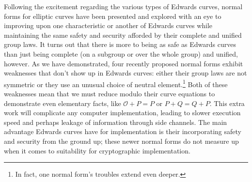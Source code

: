 Following the excitement regarding the various types of Edwards curves,
    normal forms for elliptic curves have been presented and explored with an
    eye to improving upon one characteristic or another of Edwards curves while
    maintaining the same safety and security afforded by their complete and
    unified group laws.
It turns out that there is more to being as safe as Edwards curves than just
    being complete (on a subgroup or over the whole group) and unified,
    however.
As we have demonstrated, four recently proposed normal forms exhibit weaknesses
    that don't show up in Edwards curves: either their group laws are not
    symmetric or they use an unusual choice of neutral element.\footnote{In
    fact, one normal form's troubles extend even deeper.}
Both of these weaknesses mean that we must reduce modulo their curve equations
    to demonstrate even elementary facts, like $\mathcal{O} + P = P$ or $P + Q
    = Q + P$.
This extra work will complicate any computer implementation, leading to slower
    execution speed and perhaps leakage of information through side channels.
The main advantage Edwards curves have for implementation is their
    incorporating safety and security from the ground up; these newer normal
    forms do not measure up when it comes to suitability for cryptographic
    implementation.
